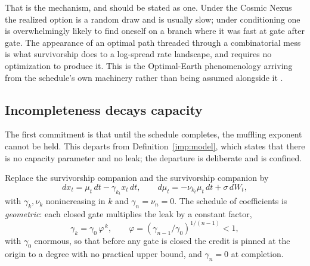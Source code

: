 That is the mechanism, and should be stated as one. Under the Cosmic Nexus the
realized option is a random draw and is usually slow; under conditioning
one is overwhelmingly likely to find oneself on a branch where it was
fast at gate after gate. The appearance of an optimal path threaded
through a combinatorial mess is what survivorship does to a log-spread
rate landscape, and requires no optimization to produce it. This is the
Optimal-Earth phenomenology arriving from the schedule's own machinery
rather than being assumed alongside it \cite{Nexus,AethusOptimalEarth}.

\subsection{Incompleteness decays capacity}\label{sch:subsub:leak}

The first commitment is that until the schedule completes, the muffling
exponent cannot be held. This departs from
Definition~\ref{imp:model}, which states that there is no capacity
parameter and no leak; the departure is deliberate and is confined.

\begin{definition}\label{sch:def:leak}
Replace the survivorship companion \cite{GoldenSurvivorship} and the survivorship companion \cite{GoldenSurvivorship} by
\begin{equation}\label{sch:eq:leak}
dx_t=\mu_t\,dt-\gamma_{k_t}x_t\,dt,
\qquad
d\mu_t=-\nu_{k_t}\mu_t\,dt+\sigma\,dW_t,
\end{equation}
with $\gamma_k,\nu_k$ nonincreasing in $k$ and $\gamma_n=\nu_n=0$. The
schedule of coefficients is \emph{geometric}: each closed gate
multiplies the leak by a constant factor,
\begin{equation}\label{sch:eq:geomleak}
\gamma_k=\gamma_0\,\varphi^{\,k},\qquad
\varphi=(\gamma_{n-1}/\gamma_0)^{1/(n-1)}<1,
\end{equation}
with $\gamma_0$ enormous, so that before any gate is closed the credit
is pinned at the origin to a degree with no practical upper bound, and $\gamma_n=0$ at completion.
\end{definition}

